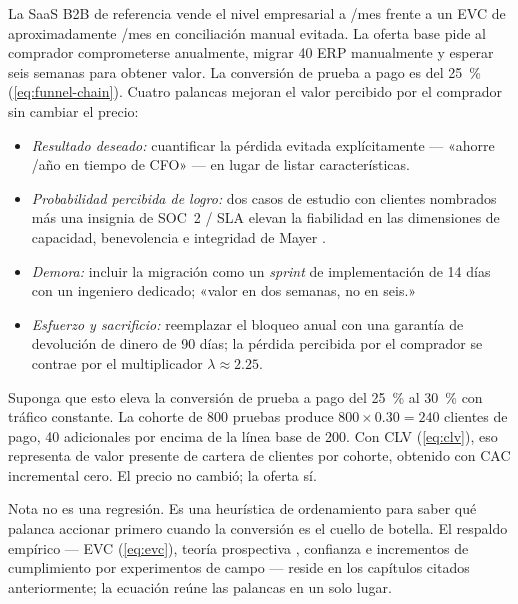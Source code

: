 \begin{example}
La SaaS B2B de referencia vende el nivel empresarial a /mes frente a un EVC de aproximadamente /mes en conciliación manual evitada. La oferta base pide al comprador comprometerse anualmente, migrar 40 ERP manualmente y esperar seis semanas para obtener valor. La conversión de prueba a pago es del \qty{25}{\percent} (\cref{eq:funnel-chain}). Cuatro palancas mejoran el valor percibido por el comprador sin cambiar el precio:

\begin{itemize}
  \item \emph{Resultado deseado:} cuantificar la pérdida evitada explícitamente --- «ahorre /año en tiempo de CFO» --- en lugar de listar características.
  \item \emph{Probabilidad percibida de logro:} dos casos de estudio con clientes nombrados \parencite{goldstein2008field} más una insignia de SOC~2 / SLA elevan la fiabilidad en las dimensiones de capacidad, benevolencia e integridad de Mayer \parencite{mayer1995model}.
  \item \emph{Demora:} incluir la migración como un \emph{sprint} de implementación de 14 días con un ingeniero dedicado; «valor en dos semanas, no en seis.»
  \item \emph{Esfuerzo y sacrificio:} reemplazar el bloqueo anual con una garantía de devolución de dinero de \num{90} días; la pérdida percibida por el comprador se contrae por el multiplicador $\lambda \approx 2.25$.
\end{itemize}

Suponga que esto eleva la conversión de prueba a pago del \qty{25}{\percent} al \qty{30}{\percent} con tráfico constante. La cohorte de 800 pruebas produce $800 \times 0.30 = 240$ clientes de pago, \num{40} adicionales por encima de la línea base de \num{200}. Con CLV  (\cref{eq:clv}), eso representa  de valor presente de cartera de clientes por cohorte, obtenido con CAC incremental cero. El precio no cambió; la oferta sí.
\end{example}

\begin{admonition}{Nota}
 no es una regresión. Es una heurística de ordenamiento para saber qué palanca accionar primero cuando la conversión es el cuello de botella. El respaldo empírico --- EVC (\cref{eq:evc}), teoría prospectiva \parencite{tversky1992cumulative}, confianza \parencite{mayer1995model,colquitt2007meta} e incrementos de cumplimiento por experimentos de campo \parencite{goldstein2008field} --- reside en los capítulos citados anteriormente; la ecuación reúne las palancas en un solo lugar.
\end{admonition}
